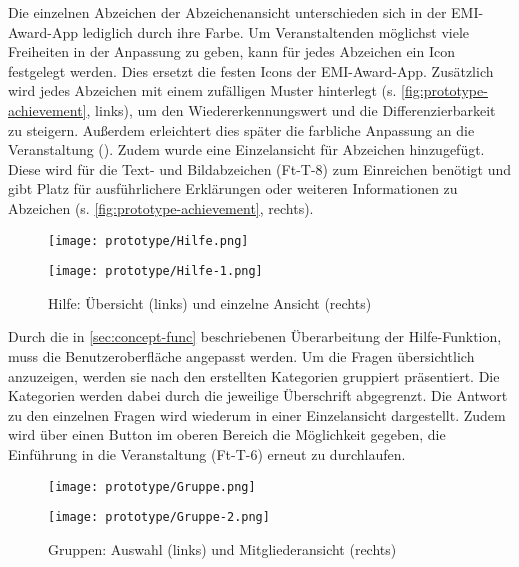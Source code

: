 Die einzelnen Abzeichen der Abzeichenansicht unterschieden sich in der
EMI-Award-App lediglich durch ihre Farbe. Um Veranstaltenden möglichst viele
Freiheiten in der Anpassung zu geben, kann für jedes Abzeichen ein Icon
festgelegt werden. Dies ersetzt die festen Icons der EMI-Award-App. Zusätzlich
wird jedes Abzeichen mit einem zufälligen Muster hinterlegt (s.
\autoref{fig:prototype-achievement}, links), um den Wiedererkennungswert und die
Differenzierbarkeit zu steigern. Außerdem erleichtert dies später die farbliche
Anpassung an die Veranstaltung (). Zudem wurde eine Einzelansicht
für Abzeichen hinzugefügt. Diese wird für die Text- und Bildabzeichen (Ft-T-8)
zum Einreichen benötigt und gibt Platz für ausführlichere Erklärungen oder
weiteren Informationen zu Abzeichen (s. \autoref{fig:prototype-achievement},
rechts).

\begin{figure}[htpb]
    \begin{minipage}{.5\textwidth}
        \centering
        \texttt{[image: prototype/Hilfe.png]}
    \end{minipage}%
    \begin{minipage}{.5\textwidth}
        \centering
        \texttt{[image: prototype/Hilfe-1.png]}
    \end{minipage}
    \caption{Hilfe: Übersicht (links) und einzelne Ansicht (rechts)}
    \label{fig:prototype-help}
\end{figure}

Durch die in \autoref{sec:concept-func} beschriebenen Überarbeitung der
Hilfe-Funktion, muss die Benutzeroberfläche angepasst werden. Um die
Fragen übersichtlich anzuzeigen, werden sie nach den erstellten Kategorien
gruppiert präsentiert. Die Kategorien werden dabei durch die jeweilige
Überschrift abgegrenzt. Die Antwort zu den einzelnen Fragen wird wiederum in
einer Einzelansicht dargestellt. Zudem wird über einen Button im oberen Bereich
die Möglichkeit gegeben, die Einführung in die Veranstaltung (Ft-T-6) erneut zu durchlaufen.

\begin{figure}[htpb]
    \begin{minipage}{.5\textwidth}
        \centering
        \texttt{[image: prototype/Gruppe.png]}
    \end{minipage}%
    \begin{minipage}{.5\textwidth}
        \centering
        \texttt{[image: prototype/Gruppe-2.png]}
    \end{minipage}
    \caption{Gruppen: Auswahl (links) und Mitgliederansicht (rechts)}
    \label{fig:prototype-groups-1}
\end{figure}

